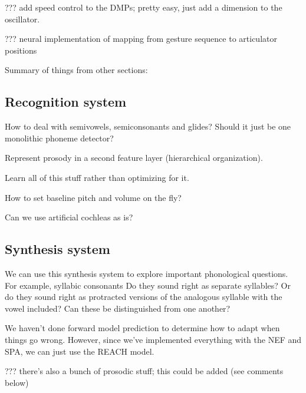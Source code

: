 ??? add speed control to the DMPs;
pretty easy, just add a dimension to the oscillator.

??? neural implementation of mapping
from gesture sequence to articulator positions

Summary of things from other sections:

\subsection{Recognition system}

How to deal with semivowels, semiconsonants and glides?
Should it just be one monolithic phoneme detector?

Represent prosody in a second feature layer (hierarchical organization).

Learn all of this stuff rather than optimizing for it.

How to set baseline pitch and volume on the fly?

Can we use artificial cochleas as is?

\subsection{Synthesis system}

We can use this synthesis system to explore
important phonological questions.
For example, syllabic consonants
Do they sound right as separate syllables?
Or do they sound right as protracted versions
of the analogous syllable with the vowel included?
Can these be distinguished from one another?

We haven't done forward model prediction
to determine how to adapt
when things go wrong.
However, since we've implemented everything
with the NEF and SPA,
we can just use the REACH model.

??? there's also a bunch of prosodic stuff;
this could be added (see comments below)



